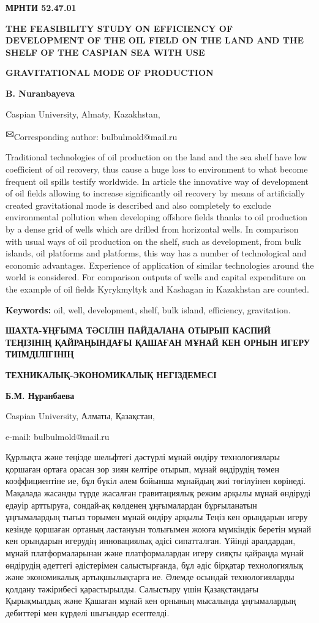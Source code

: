 \newpage
{\bfseries МРНТИ 52.47.01}

{\bfseries THE FEASIBILITY STUDY ON EFFICIENCY OF DEVELOPMENT OF THE OIL
FIELD ON THE LAND AND THE SHELF OF THE CASPIAN SEA WITH USE}

{\bfseries GRAVITATIONAL MODE OF PRODUCTION}

{\bfseries B. Nuranbayeva}

Caspian University, Almaty, Kazakhstan,

{\bfseries \textsuperscript{🖂}}Corresponding author: bulbulmold@mail.ru

Traditional technologies of oil production on the land and the sea shelf
have low coefficient of oil recovery, thus cause a huge loss to
environment to what become frequent oil spills testify worldwide. In
article the innovative way of development of oil fields allowing to
increase significantly oil recovery by means of artificially created
gravitational mode is described and also completely to exclude
environmental pollution when developing offshore fields thanks to oil
production by a dense grid of wells which are drilled from horizontal
wells. In comparison with usual ways of oil production on the shelf,
such as development, from bulk islands, oil platforms and platforms,
this way has a number of technological and economic advantages.
Experience of application of similar technologies around the world is
considered. For comparison outputs of wells and capital expenditure on
the example of oil fields Kyrykmyltyk and Kashagan in Kazakhstan are
counted.

{\bfseries Keywords:} oil, well, development, shelf, bulk island,
efficiency, gravitation.

{\bfseries ШАХТА-ҰҢҒЫМА ТӘСІЛІН ПАЙДАЛАНА ОТЫРЫП КАСПИЙ ТЕҢІЗІНІҢ
ҚАЙРАҢЫНДАҒЫ ҚАШАҒАН МҰНАЙ КЕН ОРНЫН ИГЕРУ ТИІМДІЛІГІНІҢ}

{\bfseries ТЕХНИКАЛЫҚ-ЭКОНОМИКАЛЫҚ НЕГІЗДЕМЕСІ}

{\bfseries Б.М. Нұранбаева}

Caspian University, Алматы, Қазақстан,

e-mail: bulbulmold@mail.ru

Құрлықта және теңізде шельфтегі дәстүрлі мұнай өндіру технологиялары
қоршаған ортаға орасан зор зиян келтіре отырып, мұнай өндірудің төмен
коэффициентіне ие, бұл бүкіл әлем бойынша мұнайдың жиі төгілуінен
көрінеді. Мақалада жасанды түрде жасалған гравитациялық режим арқылы
мұнай өндіруді едәуір арттыруға, сондай-ақ көлденең ұңғымалардан
бұрғыланатын ұңғымалардың тығыз торымен мұнай өндіру арқылы Теңіз кен
орындарын игеру кезінде қоршаған ортаның ластануын толығымен жоюға
мүмкіндік беретін мұнай кен орындарын игерудің инновациялық әдісі
сипатталған. Үйінді аралдардан, мұнай платформаларынан және
платформалардан игеру сияқты қайраңда мұнай өндірудің әдеттегі
әдістерімен салыстырғанда, бұл әдіс бірқатар технологиялық және
экономикалық артықшылықтарға ие. Әлемде осындай технологияларды қолдану
тәжірибесі қарастырылды. Салыстыру үшін Қазақстандағы Қырықмылдық және
Қашаған мұнай кен орнының мысалында ұңғымалардың дебиттері мен күрделі
шығындар есептелді.

